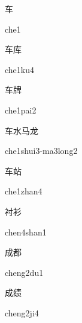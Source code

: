 \begin{multicols*}{2}
\begin{verbete}[che1]{车}
\begin{pronuncia}{che1}
\end{pronuncia}
\end{verbete}

\begin{verbete}[che1ku4]{车库}
\begin{pronuncia}{che1ku4}
\end{pronuncia}
\end{verbete}

\begin{verbete}{车牌}
\begin{pronuncia}{che1pai2}
\end{pronuncia}
\end{verbete}

\begin{verbete}{车水马龙}
\begin{pronuncia}{che1shui3-ma3long2}
\end{pronuncia}
\end{verbete}

\begin{verbete}{车站}
\begin{pronuncia}{che1zhan4}
\end{pronuncia}
\end{verbete}

\begin{verbete}{衬衫}
\begin{pronuncia}{chen4shan1}
\end{pronuncia}
\end{verbete}

\begin{verbete}[cheng2du1]{成都}
\begin{pronuncia}{cheng2du1}
\end{pronuncia}
\end{verbete}

\begin{verbete}[cheng2ji4]{成绩}
\begin{pronuncia}{cheng2ji4}
\end{pronuncia}
\end{verbete}


\end{multicols*}
